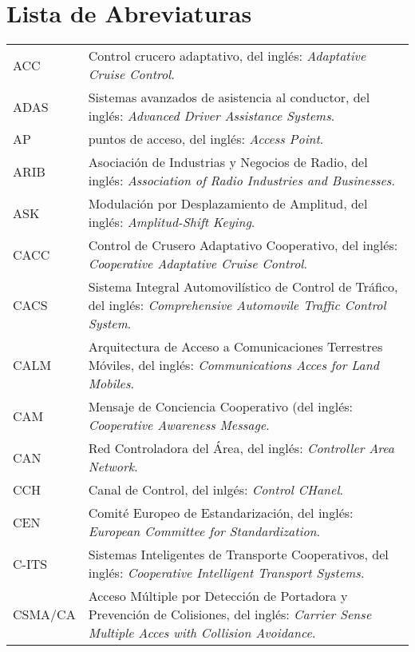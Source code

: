 \chapter*{Lista de Abreviaturas} %

\begin{tabular}{p{2cm} p{13.3cm}}%
ACC & Control crucero adaptativo, del inglés: \textit{Adaptative Cruise Control}.\\
ADAS & Sistemas avanzados de asistencia al conductor, del inglés: \textit{Advanced Driver Assistance Systems}.\\
AP & puntos de acceso, del inglés: \textit{Access Point}.\\
ARIB & Asociación de Industrias y Negocios de Radio, del inglés: \textit{Association of Radio Industries and Businesses}.\\
ASK & Modulación por Desplazamiento de Amplitud, del inglés: \textit{Amplitud-Shift Keying}.\\
CACC & Control de Crusero Adaptativo Cooperativo, del inglés: \textit{Cooperative Adaptative Cruise Control}.\\
CACS & Sistema Integral Automovilístico de Control de Tráfico, del inglés: \textit{Comprehensive Automovile Traffic Control System}.\\
CALM & Arquitectura de Acceso a Comunicaciones Terrestres Móviles, del inglés: \textit{Communications Acces for Land Mobiles}.\\
CAM & Mensaje de Conciencia Cooperativo (del inglés: \textit{Cooperative Awareness Message}.\\
CAN & Red Controladora del Área, del inglés: \textit{Controller Area Network}.\\
CCH & Canal de Control, del inlgés: \textit{Control CHanel}.\\
CEN & Comité Europeo de Estandarización, del inglés: \textit{European Committee for Standardization}.\\
C-ITS & Sistemas Inteligentes de Transporte Cooperativos, del inglés: \textit{Cooperative Intelligent Transport Systems}.\\
CSMA/CA & Acceso Múltiple por Detección de Portadora y Prevención de Colisiones, del inglés: \textit{Carrier Sense Multiple Acces with Collision Avoidance}.\\

\end{tabular}


